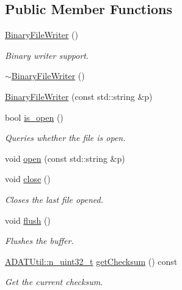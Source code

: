 \subsection*{Public Member Functions}
\begin{DoxyCompactItemize}
\item 
\mbox{\hyperlink{classADATIO_1_1BinaryFileWriter_aa0579bad52db7809ed5d30b964aa3443}{Binary\+File\+Writer}} ()
\begin{DoxyCompactList}\small\item\em Binary writer support. \end{DoxyCompactList}\item 
\mbox{\hyperlink{classADATIO_1_1BinaryFileWriter_ae74f92826c49450ba710f22300718ada}{$\sim$\+Binary\+File\+Writer}} ()
\item 
\mbox{\hyperlink{classADATIO_1_1BinaryFileWriter_a7ccd0f56a5d98e909770f3198f94e9d9}{Binary\+File\+Writer}} (const std\+::string \&p)
\item 
bool \mbox{\hyperlink{classADATIO_1_1BinaryFileWriter_a891f81b41b18e3ba86c7e8af134b603e}{is\+\_\+open}} ()
\begin{DoxyCompactList}\small\item\em Queries whether the file is open. \end{DoxyCompactList}\item 
void \mbox{\hyperlink{classADATIO_1_1BinaryFileWriter_a943ba19816b403b36f50f72740ea856a}{open}} (const std\+::string \&p)
\item 
void \mbox{\hyperlink{classADATIO_1_1BinaryFileWriter_a20a1bdb753aaf28e60de49e80ddf953d}{close}} ()
\begin{DoxyCompactList}\small\item\em Closes the last file opened. \end{DoxyCompactList}\item 
void \mbox{\hyperlink{classADATIO_1_1BinaryFileWriter_ad914b901c6386a2ad7b2c8cf9bddfa9b}{flush}} ()
\begin{DoxyCompactList}\small\item\em Flushes the buffer. \end{DoxyCompactList}\item 
\mbox{\hyperlink{namespaceADATUtil_ad945a8afa4db2d1f89b731964adae97e}{A\+D\+A\+T\+Util\+::n\+\_\+uint32\+\_\+t}} \mbox{\hyperlink{classADATIO_1_1BinaryFileWriter_ad6f9d995a02d4b3e8e12ad18972d58a5}{get\+Checksum}} () const
\begin{DoxyCompactList}\small\item\em Get the current checksum. \end{DoxyCompactList}\item 

\end{DoxyCompactItemize}
